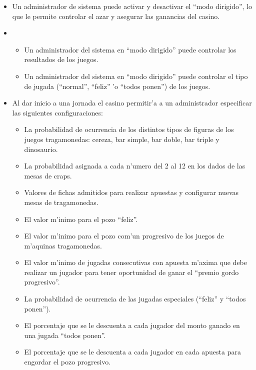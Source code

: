 \clearpage


\begin{itemize}

\item {} 

    Un administrador de sistema puede activar y desactivar el ``modo dirigido'', lo que le permite controlar el azar y asegurar las ganancias del casino.

\item {}

    \begin{itemize}
        \item Un administrador del sistema en ``modo dirigido'' puede controlar los resultados de los juegos.
        \item Un administrador del sistema en ``modo dirigido'' puede controlar el tipo de jugada (``normal'', ``feliz'' 'o ``todos ponen'') de los juegos.
    \end{itemize}


\item {}

    Al dar inicio a una jornada el casino permitir'a a un administrador especificar las siguientes configuraciones:
    \begin{itemize}
        \item La probabilidad de ocurrencia de los distintos tipos de figuras de los juegos tragamonedas: cereza, bar simple, bar doble, bar triple y dinosaurio.
        \item La probabilidad asignada a cada n'umero del 2 al 12 en los dados de las mesas de craps.
        \item Valores de fichas admitidos para realizar apuestas y configurar nuevas mesas de tragamonedas.
        \item El valor m'inimo para el pozo ``feliz''.
        \item El valor m'inimo para el pozo com'un progresivo de los juegos de m'aquinas tragamonedas.
        \item El valor m'inimo de jugadas consecutivas con apuesta m'axima que debe realizar un jugador para tener oportunidad de ganar el ``premio gordo progresivo''.
        \item La probabilidad de ocurrencia de las jugadas especiales (``feliz'' y ``todos ponen'').
        \item El porcentaje que se le descuenta a cada jugador del monto ganado en una jugada ``todos ponen''.
        \item El porcentaje que se le descuenta a cada jugador en cada apuesta para engordar el pozo progresivo.
    \end{itemize}


\end{itemize}
